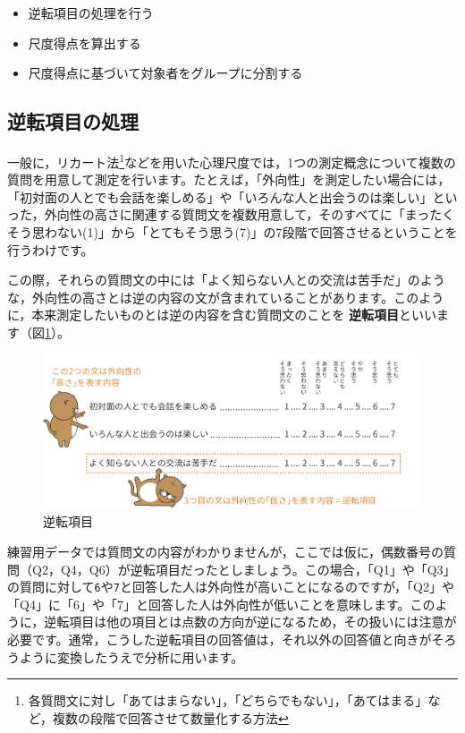 \documentclass[
  12pt,
  a5jpaper,
  lualatex, ja=standard]{bxjsbook}
\providecommand{\tightlist}{%
  \setlength{\itemsep}{0pt}\setlength{\parskip}{0pt}}
\renewcommand{\emph}[1]{\textbf{\color{emph} #1}}
\begin{document}
\begin{itemize}
\tightlist
\item
  逆転項目の処理を行う
\item
  尺度得点を算出する
\item
  尺度得点に基づいて対象者をグループに分割する
\end{itemize}

\hypertarget{sub:basics-reverse-items}{%
\subsection{逆転項目の処理}\label{sub:basics-reverse-items}}

一般に，リカート法\footnote{各質問文に対し「あてはまらない」，「どちらでもない」，「あてはまる」など，複数の段階で回答させて数量化する方法}などを用いた心理尺度では，1つの測定概念について複数の質問を用意して測定を行います。たとえば，「外向性」を測定したい場合には，「初対面の人とでも会話を楽しめる」や「いろんな人と出会うのは楽しい」といった，外向性の高さに関連する質問文を複数用意して，そのすべてに「まったくそう思わない(1)」から「とてもそう思う(7)」の7段階で回答させるということを行うわけです。

この際，それらの質問文の中には「よく知らない人との交流は苦手だ」のような，外向性の高さとは逆の内容の文が含まれていることがあります。このように，本来測定したいものとは逆の内容を含む質問文のことを\emph{逆転項目}といいます（図\ref{fig:basics-exercise-reverse}）。

\begin{figure}[!ht]

{\centering \includegraphics[width=1\linewidth]{images/basics/exercise-reverse} 

}

\caption{逆転項目}\label{fig:basics-exercise-reverse}
\end{figure}

練習用データでは質問文の内容がわかりませんが，ここでは仮に，偶数番号の質問（Q2，Q4，Q6）が逆転項目だったとしましょう。この場合，「Q1」や「Q3」の質問に対して\texttt{6}や\texttt{7}と回答した人は外向性が高いことになるのですが，「Q2」や「Q4」に「6」や「7」と回答した人は外向性が低いことを意味します。このように，逆転項目は他の項目とは点数の方向が逆になるため，その扱いには注意が必要です。通常，こうした逆転項目の回答値は，それ以外の回答値と向きがそろうように変換したうえで分析に用います。
\end{document}
